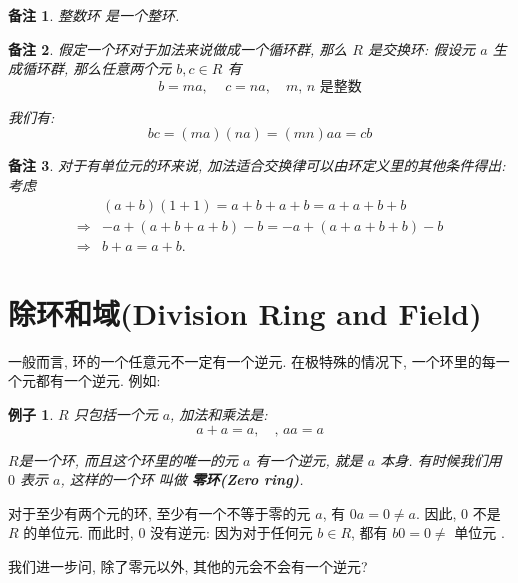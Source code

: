 \documentclass[utf8]{ctexbook}
\newtheorem{memo}{备注}[section]
\newtheorem{example}{例子}[section]
\begin{document}
\begin{memo}
整数环 是一个整环. 
\end{memo}

\begin{memo}
假定一个环对于加法来说做成一个循环群, 那么 $R$ 是交换环: 假设元 $a$ 生成循环群, 那么任意两个元 $b, c \in R$ 有
\begin{equation}
b = ma, \quad \, c = n a, \quad m, \, n \mbox{ 是整数}
\end{equation}  

我们有:
\begin{equation}
bc = (ma ) (na) = (mn) a a = c b
\end{equation}

\end{memo}


\begin{memo}
对于有单位元的环来说, 加法适合交换律可以由环定义里的其他条件得出: 考虑
\begin{align*}
 & (a+b) (1+1) = a+b+a+b = a+a+b+b  \\
 \Rightarrow & -a + (a+b+a+b) - b = -a + (a+a+b+b ) -b \\
 \Rightarrow & b+a = a + b   .
\end{align*}

\end{memo}

\section{除环和域(Division Ring and Field)}

一般而言, 环的一个任意元不一定有一个逆元. 在极特殊的情况下, 一个环里的每一个元都有一个逆元. 例如:

\begin{example}
$R$ 只包括一个元 $a$, 加法和乘法是:
\begin{equation}
a + a = a, \quad, \, a a = a
\end{equation}

$R$是一个环, 而且这个环里的唯一的元 $a$ 有一个逆元, 就是 $a$ 本身. 有时候我们用 $0$ 表示 $a$, 这样的一个环 叫做 \textbf{零环(Zero ring)}.

\end{example}


对于至少有两个元的环, 至少有一个不等于零的元 $a$, 有 $0 a = 0 \neq a$. 因此, $0$ 不是 $R$ 的单位元. 而此时, $0$ 没有逆元: 因为对于任何元 $b \in R$, 都有 $b0 =  0 \neq \mbox{ 单位元 }$.

我们进一步问, 除了零元以外, 其他的元会不会有一个逆元? 
\end{document}

